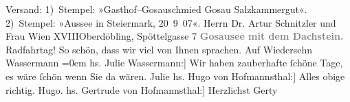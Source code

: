 \begin{ledgroupsized}[t]{13cm}
{\newline{}Versand: 1) Stempel: »\nobreak{}Gasthof–Gosauschmied Gosau
                                       Salzkammergut\nobreak{}«.   2) Stempel: »\nobreak{}Aussee in Steiermark, 20 9 07\nobreak{}«. }\pstart{}{\pb}Herrn Dr. Artur Schnitzler und Frau \pend{}\pstart{}Wien XVIII\pend{}\pstart{}Oberdöbling, Spöttelgasse 7\pend{}{\bigskip}\pstart
           \noindent{}\centering{}\textcolor{gray}{\textbf{{\pb}Gosausee mit dem Dachstein.}}\pend
           \pstart
           {\pb}Radfahrtag! So schön, dass wir viel von
               Ihnen sprachen. \pend
           \pstart
           Auf Wiedersehn {\\[\baselineskip]}\spacefill\mbox{Wassermann}\pend
           \leftskip=0em{}\pstart
           \noindent{}{[}hs. Julie Wassermann:{]} Wir haben zauberhafte ſchöne Tage, es wäre ſchön wenn
               Sie da wären.\pend
           \pstart \spacefill\mbox{Julie}\pend{}\pstart
           \noindent{}{[}hs. Hugo von Hofmannsthal:{]} Alles obige richtig.\pend
           \pstart \spacefill\mbox{Hugo.}\pend{}\pstart
           \noindent{}{[}hs. Gertrude von Hofmannsthal:{]} Herzlichst\pend
           \pstart \spacefill\mbox{Gerty}\pend{}
         
         \endnumbering{}\end{ledgroupsized}  \newcommand{\dateiname}{L01709}\newcommand{\titel}{Jakob und Julie Wassermann, Hugo und Gerty von Hofmannsthal an Arthur und Olga Schnitzler, 20. 9. 1907}\newcommand{\editorInnen}{Martin Anton Müller und Gerd-Hermann Susen}
      